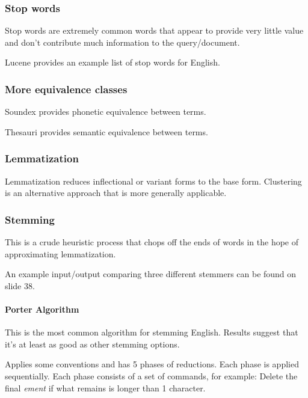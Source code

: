 \documentclass{idc_msc}
\begin{document}
\subsubsection{Stop words}

Stop words are extremely common words that appear to provide very little value and don't contribute much information to the query/document.

Lucene provides an example list of stop words for English.

\subsubsection{More equivalence classes}

Soundex\cite[Chapter 3]{manning2008introduction} provides phonetic equivalence between terms.

Thesauri\cite[Chapter 9]{manning2008introduction} provides semantic equivalence between terms.

\subsubsection{Lemmatization}

Lemmatization reduces inflectional or variant forms to the base form.
Clustering is an alternative approach that is more generally applicable.

\subsubsection{Stemming}

This is a crude heuristic process that chops off the ends of words in the hope of approximating lemmatization.

An example input/output comparing three different stemmers can be found on slide 38.

\paragraph{Porter Algorithm}

This is the most common algorithm for stemming English.
Results suggest that it's at least as good as other stemming options.

Applies some conventions and has 5 phases of reductions.
Each phase is applied sequentially.
Each phase consists of a set of commands, for example: Delete the final \textit{ement} if what remains is longer than 1 character.
\end{document}
